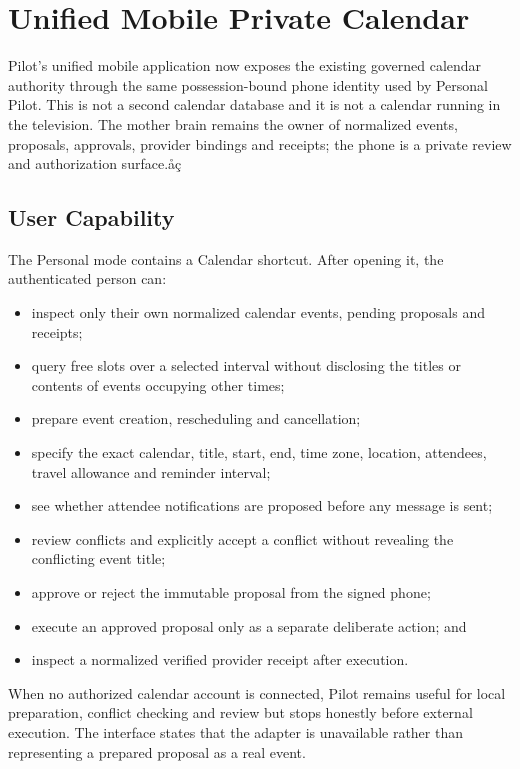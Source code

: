 \section{Unified Mobile Private Calendar}
\label{sec:pilot-unified-mobile-calendar}

Pilot's unified mobile application now exposes the existing governed calendar authority through
the same possession-bound phone identity used by Personal Pilot.  This is not a second calendar
database and it is not a calendar running in the television.  The mother brain remains the owner
of normalized events, proposals, approvals, provider bindings and receipts; the phone is a private
review and authorization surface.åç

\subsection{User Capability}

The Personal mode contains a Calendar shortcut.  After opening it, the authenticated person can:
\begin{itemize}
  \item inspect only their own normalized calendar events, pending proposals and receipts;
  \item query free slots over a selected interval without disclosing the titles or contents of
        events occupying other times;
  \item prepare event creation, rescheduling and cancellation;
  \item specify the exact calendar, title, start, end, time zone, location, attendees, travel
        allowance and reminder interval;
  \item see whether attendee notifications are proposed before any message is sent;
  \item review conflicts and explicitly accept a conflict without revealing the conflicting
        event title;
  \item approve or reject the immutable proposal from the signed phone;
  \item execute an approved proposal only as a separate deliberate action; and
  \item inspect a normalized verified provider receipt after execution.
\end{itemize}

When no authorized calendar account is connected, Pilot remains useful for local preparation,
conflict checking and review but stops honestly before external execution.  The interface states
that the adapter is unavailable rather than representing a prepared proposal as a real event.

